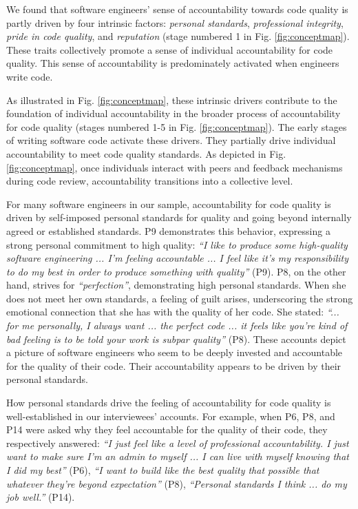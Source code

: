 We found that software engineers' sense of accountability towards code quality is partly driven by four intrinsic factors: \emph{personal standards}, \emph{professional integrity}, \emph{pride in code quality}, and \emph{reputation} (stage numbered 1 in Fig. \ref{fig:conceptmap}). These traits collectively promote a sense of individual accountability for code quality. This sense of accountability is predominately activated when engineers write code.

As illustrated in Fig. \ref{fig:conceptmap}, these intrinsic drivers contribute to the foundation of individual accountability in the broader process of accountability for code quality (stages numbered 1-5 in Fig. \ref{fig:conceptmap}). The early stages of writing software code activate these drivers. They partially drive individual accountability to meet code quality standards. As depicted in Fig. \ref{fig:conceptmap}, once individuals interact with peers and feedback mechanisms during code review, accountability transitions into a collective level.

 For many software engineers in our sample, accountability for code quality is driven by self-imposed personal standards for quality and going beyond internally agreed or established standards. P9 demonstrates this behavior, expressing a strong personal commitment to high quality: \emph{``I like to produce some high-quality software engineering ... I'm feeling accountable ... I feel like it's my responsibility to do my best in order to produce something with quality''} (P9). P8, on the other hand, strives for \emph{``perfection''}, demonstrating high personal standards. When she does not meet her own standards, a feeling of guilt arises, underscoring the strong emotional connection that she has with the quality of her code. She stated: \emph{``... for me personally, I always want ... the perfect code ... it feels like you're kind of bad feeling is to be told your work is subpar quality''} (P8). These accounts depict a picture of software engineers who seem to be deeply invested and accountable for the quality of their code. Their accountability appears to be driven by their personal standards.

How personal standards drive the feeling of accountability for code quality is well-established in our interviewees' accounts. For example, when P6, P8, and P14 were asked why they feel accountable for the quality of their code, they respectively answered: \emph{``I just feel like a level of professional accountability. I just want to make sure I'm an admin to myself ... I can live with myself knowing that I did my best''} (P6), \emph{``I want to build like the best quality that possible that whatever they're beyond expectation''} (P8), \emph{``Personal standards I think ... do my job well.''} (P14). 

